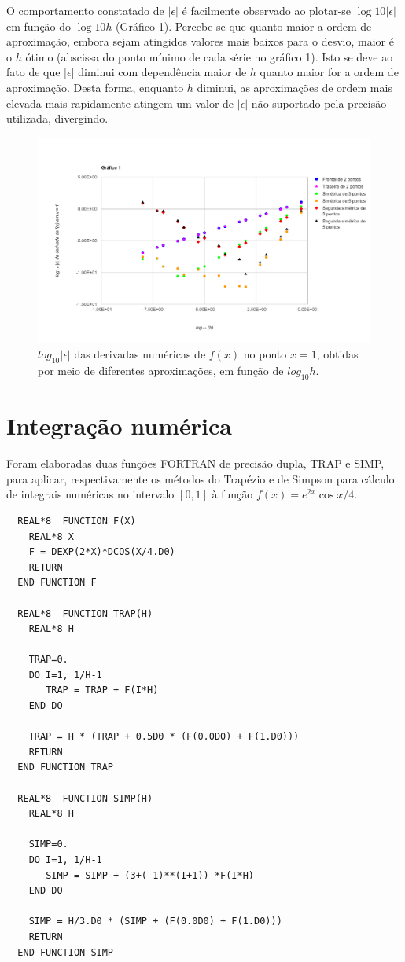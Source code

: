 \documentclass{article}
\begin{document}
O comportamento constatado de $|\epsilon|$ é facilmente observado ao plotar-se $\log10{|\epsilon|}$ em função do $\log10{h}$ (Gráfico 1). Percebe-se que quanto maior a  ordem de aproximação, embora sejam atingidos valores mais baixos para o desvio, maior é o $h$ ótimo (abscissa do ponto mínimo de cada série no gráfico 1). Isto se deve ao fato de que $|\epsilon|$ diminui com dependência maior de $h$ quanto maior for a ordem de aproximação. Desta forma, enquanto $h$ diminui, as aproximações de ordem mais elevada mais rapidamente atingem um valor de $|\epsilon|$ não suportado pela precisão utilizada, divergindo.

\begin{figure}[h]
  \centering
  \includegraphics[width=\textwidth]{graf1}
  \caption{$log_{10}|\epsilon|$ das derivadas numéricas de $f (x)$ no ponto $x = 1$, obtidas
por meio de diferentes aproximações, em função de $log_{10}h$.}
\label{fig:1}
\end{figure}

\section{Integração numérica}
Foram elaboradas duas funções FORTRAN de precisão dupla, TRAP e SIMP, para aplicar, respectivamente os métodos do Trapézio e de Simpson para cálculo de integrais numéricas no intervalo $[0,1]$ à função $f(x) = e^{2x}\cos{x/4}$.\par

\begin{lstlisting}
  REAL*8  FUNCTION F(X)
    REAL*8 X
    F = DEXP(2*X)*DCOS(X/4.D0)
    RETURN
  END FUNCTION F
  
  REAL*8  FUNCTION TRAP(H)
    REAL*8 H
    
    TRAP=0.
    DO I=1, 1/H-1
       TRAP = TRAP + F(I*H)
    END DO
    
    TRAP = H * (TRAP + 0.5D0 * (F(0.0D0) + F(1.D0)))
    RETURN
  END FUNCTION TRAP
  
  REAL*8  FUNCTION SIMP(H)
    REAL*8 H
    
    SIMP=0.
    DO I=1, 1/H-1
       SIMP = SIMP + (3+(-1)**(I+1)) *F(I*H)
    END DO
    
    SIMP = H/3.D0 * (SIMP + (F(0.0D0) + F(1.D0)))
    RETURN
  END FUNCTION SIMP

\end{lstlisting}
\end{document}
